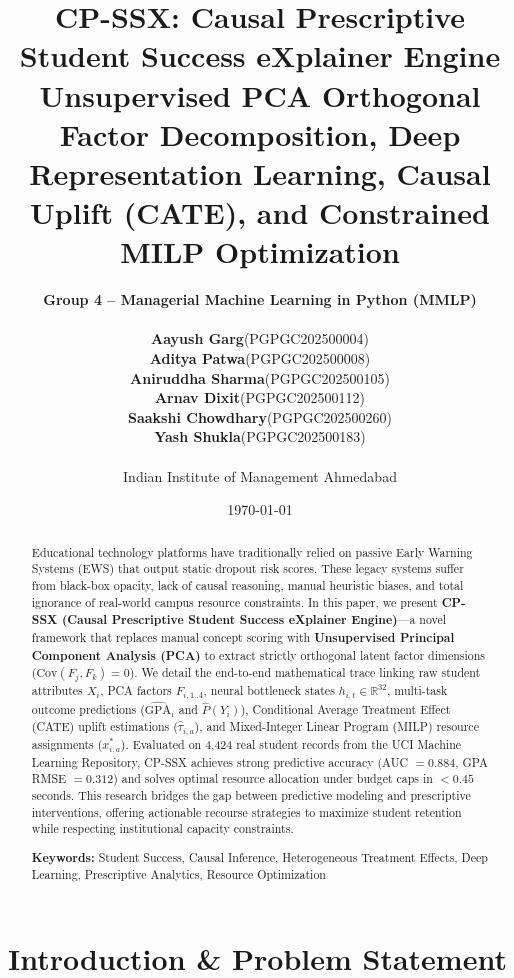 \documentclass[11pt, a4paper]{article}
\title{\LARGE \textbf{CP-SSX: Causal Prescriptive Student Success eXplainer Engine}\\[0.3em]
\Large Unsupervised PCA Orthogonal Factor Decomposition, Deep Representation Learning, Causal Uplift (CATE), and Constrained MILP Optimization}
\author{
    \textbf{Group 4 -- Managerial Machine Learning in Python (MMLP)}\\[0.5em]
    \small
    \begin{tabular}{c c}
        \textbf{Aayush Garg} & (PGPGC202500004) \\
        \textbf{Aditya Patwa} & (PGPGC202500008) \\
        \textbf{Aniruddha Sharma} & (PGPGC202500105) \\
        \textbf{Arnav Dixit} & (PGPGC202500112) \\
        \textbf{Saakshi Chowdhary} & (PGPGC202500260) \\
        \textbf{Yash Shukla} & (PGPGC202500183) \\
    \end{tabular}\\[0.5em]
    \small Indian Institute of Management Ahmedabad
}
\date{\today}
\begin{document}
\maketitle

\begin{abstract}
Educational technology platforms have traditionally relied on passive Early Warning Systems (EWS) that output static dropout risk scores. These legacy systems suffer from black-box opacity, lack of causal reasoning, manual heuristic biases, and total ignorance of real-world campus resource constraints. In this paper, we present \textbf{CP-SSX (Causal Prescriptive Student Success eXplainer Engine)}—a novel framework that replaces manual concept scoring with \textbf{Unsupervised Principal Component Analysis (PCA)} to extract strictly orthogonal latent factor dimensions ($\text{Cov}(F_j, F_k) = 0$). We detail the end-to-end mathematical trace linking raw student attributes $X_i$, PCA factors $F_{i,1..4}$, neural bottleneck states $h_{i,t} \in \mathbb{R}^{32}$, multi-task outcome predictions ($\widehat{\text{GPA}}_i$ and $\hat{P}(Y_i)$), Conditional Average Treatment Effect (CATE) uplift estimations ($\hat{\tau}_{i,a}$), and Mixed-Integer Linear Program (MILP) resource assignments ($x_{i,a}^*$). Evaluated on 4,424 real student records from the UCI Machine Learning Repository, CP-SSX achieves strong predictive accuracy (AUC $= 0.884$, GPA RMSE $= 0.312$) and solves optimal resource allocation under budget caps in $<0.45$ seconds. This research bridges the gap between predictive modeling and prescriptive interventions, offering actionable recourse strategies to maximize student retention while respecting institutional capacity constraints.

\vspace{0.5cm}
\noindent \textbf{Keywords:} Student Success, Causal Inference, Heterogeneous Treatment Effects, Deep Learning, Prescriptive Analytics, Resource Optimization
\end{abstract}

\newpage
\tableofcontents
\newpage

\section{Introduction \texorpdfstring{\&}{and} Problem Statement}
\end{document}
